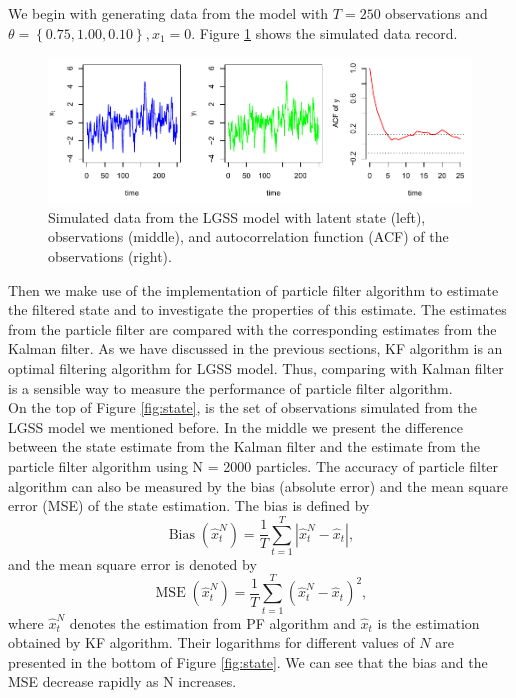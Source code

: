 \documentclass[mstat,12pt]{unswthesis}  %
\numberwithin{equation}{section}
\begin{document}
\noindent We begin with generating data from the
model with $T=250$ observations and $\theta =\left\{0.75,1.00,0.10\right\}, x_{1}=0$. Figure \ref{fig:datagene}
shows the simulated data record.\\
\begin{figure}[H]
    \centering
    \includegraphics[width=1.0\linewidth]{datagene.pdf}
    \caption
    {Simulated data from the LGSS model with latent state (left), observations (middle), and autocorrelation function (ACF) of the observations (right).}
    \label{fig:datagene}
\end{figure}

\noindent Then we make use of the implementation of particle filter algorithm to estimate the filtered state and
to investigate the properties of this estimate. The estimates from the particle filter are
compared with the corresponding estimates from the Kalman filter. As we have discussed in the previous
sections, KF  algorithm  is   an  optimal  filtering algorithm for LGSS model. Thus, comparing with Kalman filter
is a sensible way to measure the performance of particle filter algorithm. \\

\noindent On the top of Figure \ref{fig:state}, is the set of observations simulated from the LGSS model we mentioned before. In the middle  we present the difference between the  state estimate from
the Kalman filter and the estimate from the particle filter algorithm using N = 2000 particles.
The accuracy of particle filter algorithm can also be measured by
the bias (absolute error) and the mean square error
(MSE) of the state estimation.
The bias is defined by 
\begin{equation}\operatorname{Bias}\left(\widehat{x}_{t}^{N}\right)=\frac{1}{T} \sum_{t=1}^{T}\left|\widehat{x}_{t}^{N}-\widehat{x}_{t}\right|,\end{equation}
and the mean square error is denoted by
\begin{equation}\operatorname{MSE}\left(\widehat{x}_{t}^{N}\right)=\frac{1}{T} \sum_{t=1}^{T}\left(\widehat{x}_{t}^{N}-\widehat{x}_{t}\right)^{2},\end{equation}
where $\widehat{x}_{t}^{N}$ denotes the estimation from
PF algorithm and $\widehat{x}_{t}$ is the estimation obtained by KF algorithm. Their logarithms for different
values of $N$ are presented in the bottom of  Figure \ref{fig:state}. We can see that the bias and the MSE decrease rapidly as N increases.\\
\end{document}
